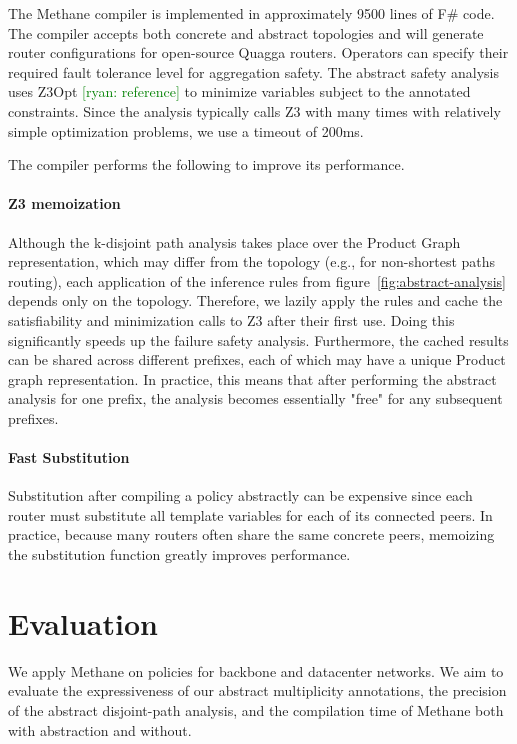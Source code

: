 \documentclass{sig-alternate-10pt}
\newcommand{\ryan}[1]{\textcolor{green}{[ryan: #1]}}
\newcommand{\sysname}{{\small \sf Methane}\xspace}
\newcommand{\para}[1]{\paragraph*{\textbf{#1}}}
\begin{document}
The \sysname compiler is implemented in approximately 9500 lines of F\# code. The compiler accepts both concrete and abstract topologies and will generate router configurations for open-source Quagga routers. Operators can specify their required fault tolerance level for aggregation safety. The abstract safety analysis uses Z3Opt \ryan{reference} to minimize variables subject to the annotated constraints. Since the analysis typically calls Z3 with many times with relatively simple optimization problems, we use a timeout of 200ms. 

The compiler performs the following to improve its performance.

\para{Z3 memoization}

Although the k-disjoint path analysis takes place over the Product Graph representation, which may differ from the topology (e.g., for non-shortest paths routing), each application of the inference rules from figure~\ref{fig:abstract-analysis} depends only on the topology. Therefore, we lazily apply the rules and cache the satisfiability and minimization calls to Z3 after their first use. Doing this significantly speeds up the failure safety analysis. Furthermore, the cached results can be shared across different prefixes, each of which may have a unique Product graph representation. In practice, this means that after performing the abstract analysis for one prefix, the analysis becomes essentially "free" for any subsequent prefixes.

\para{Fast Substitution}

Substitution after compiling a policy abstractly can be expensive since each router must substitute all template variables for each of its connected peers. In practice, because many routers often share the same concrete peers, memoizing the substitution function greatly improves performance.


%
%
%
%


\section{Evaluation}
\label{sec:evaluation}

We apply \sysname on policies for backbone and datacenter networks. We aim to evaluate the expressiveness of our abstract multiplicity annotations, the precision of the abstract disjoint-path analysis, and the compilation time of \sysname both with abstraction and without.
\end{document}
